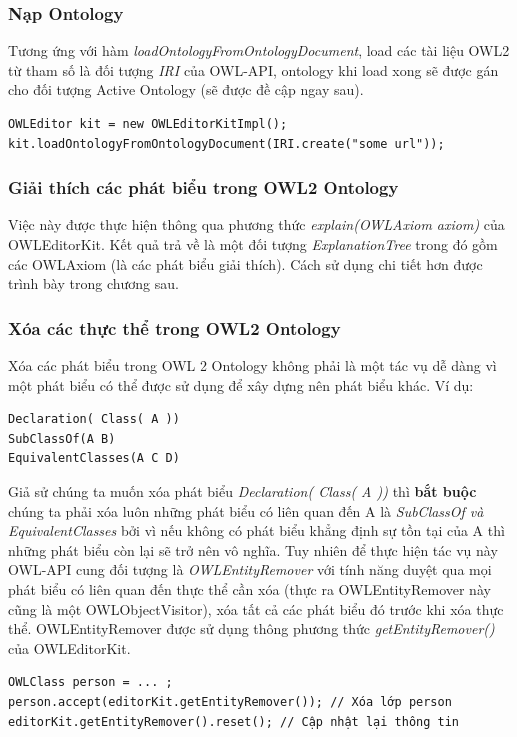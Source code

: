 {\subsubsection{Nạp Ontology}
Tương ứng với hàm \textit{loadOntologyFromOntologyDocument}, load các tài liệu OWL2 từ tham số là đối tượng \textit{IRI} của OWL-API, ontology khi load xong sẽ được gán cho đối tượng Active Ontology (sẽ được đề cập ngay sau).
\begin{verbatim}
OWLEditor kit = new OWLEditorKitImpl();
kit.loadOntologyFromOntologyDocument(IRI.create("some url"));
\end{verbatim}
\subsubsection{Giải thích các phát biểu trong OWL2 Ontology}
Việc này được thực hiện thông qua phương thức \textit{explain(OWLAxiom axiom)} của OWLEditorKit. Kết quả trả về là một đối tượng \textit{ExplanationTree} trong đó gồm các OWLAxiom (là các phát biểu giải thích). Cách sử dụng chi tiết hơn được trình bày trong chương sau.

\subsubsection{Xóa các thực thể trong OWL2 Ontology}
Xóa các phát biểu trong OWL 2 Ontology không phải là một tác vụ dễ dàng vì một phát biểu có thể được sử dụng để xây dựng nên phát biểu khác. Ví dụ:
\begin{verbatim}
Declaration( Class( A ))
SubClassOf(A B)
EquivalentClasses(A C D)
\end{verbatim}
Giả sử chúng ta muốn xóa phát biểu \textit{Declaration( Class( A ))} thì \textbf{bắt buộc} chúng ta phải xóa luôn những phát biểu có liên quan đến A là \textit{SubClassOf và EquivalentClasses} bởi vì nếu không có phát biểu khẳng định sự tồn tại của A thì những phát biểu còn lại sẽ trở nên vô nghĩa. Tuy nhiên để thực hiện tác vụ này OWL-API cung đối tượng là \textit{OWLEntityRemover} với tính năng duyệt qua mọi phát biểu có liên quan đến thực thể cần xóa (thực ra OWLEntityRemover này cũng là một OWLObjectVisitor), xóa tất cả các phát biểu đó trước khi xóa thực thể. OWLEntityRemover được sử dụng thông phương thức \textit{getEntityRemover()} của OWLEditorKit. 
\begin{verbatim}
OWLClass person = ... ;
person.accept(editorKit.getEntityRemover()); // Xóa lớp person 
editorKit.getEntityRemover().reset(); // Cập nhật lại thông tin
\end{verbatim}

}
